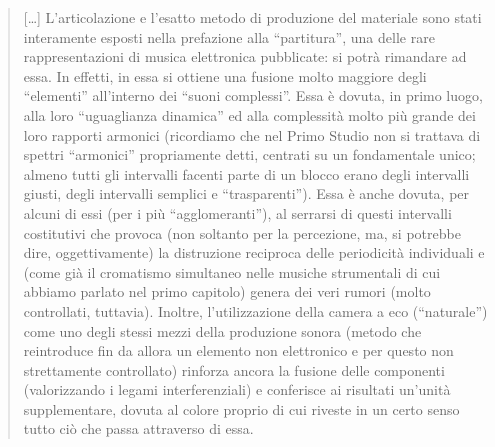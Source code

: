 \begin{quote}

[\ldots] L’articolazione e l’esatto metodo di produzione del materiale sono stati interamente esposti nella prefazione alla “partitura”, una delle rare rappresentazioni di musica elettronica pubblicate: si potrà rimandare ad essa. In effetti, in essa si ottiene una fusione molto maggiore degli “elementi” all’interno dei “suoni complessi”. Essa è dovuta, in primo luogo, alla loro “uguaglianza dinamica” ed alla complessità molto più grande dei loro rapporti armonici (ricordiamo che nel Primo Studio non si trattava di spettri “armonici” propriamente detti, centrati su un fondamentale unico; almeno tutti gli intervalli facenti parte di un blocco erano degli intervalli giusti, degli intervalli semplici e “trasparenti”). Essa è anche dovuta, per alcuni di essi (per i più “agglomeranti”), al serrarsi di questi intervalli costitutivi che provoca (non soltanto per la percezione, ma, si potrebbe dire, oggettivamente) la distruzione reciproca delle periodicità individuali e (come già il cromatismo simultaneo nelle musiche strumentali di cui abbiamo parlato nel primo capitolo) genera dei veri rumori (molto controllati, tuttavia). Inoltre, l’utilizzazione della camera a eco (“naturale”) come uno degli stessi mezzi della produzione sonora (metodo che reintroduce fin da allora un elemento non elettronico e per questo non strettamente controllato) rinforza ancora la fusione delle componenti (valorizzando i legami interferenziali) e conferisce ai risultati un’unità supplementare, dovuta al colore proprio di cui riveste in un certo senso tutto ciò che passa attraverso di essa.


\end{quote}
